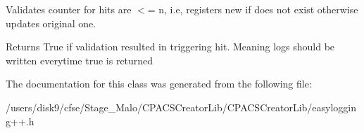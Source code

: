 Validates counter for hits are $<$= n, i.\-e, registers new if does not exist otherwise updates original one. 

\begin{DoxyReturn}{Returns}
True if validation resulted in triggering hit. Meaning logs should be written everytime true is returned 
\end{DoxyReturn}


The documentation for this class was generated from the following file\-:\begin{DoxyCompactItemize}
\item 
/users/disk9/cfse/\-Stage\-\_\-\-Malo/\-C\-P\-A\-C\-S\-Creator\-Lib/\-C\-P\-A\-C\-S\-Creator\-Lib/easylogging++.\-h\end{DoxyCompactItemize}
